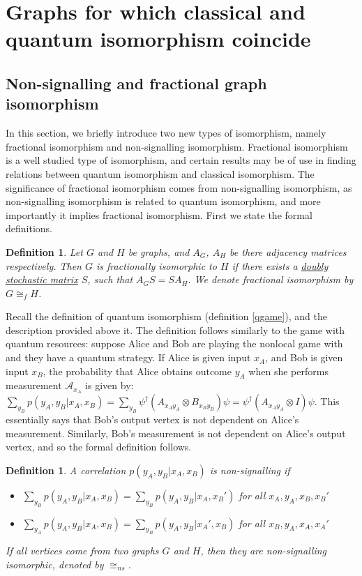 \documentclass[12pt]{article}
\newtheorem{defn}[thm]{Definition}
\begin{document}
\section{Graphs for which classical and quantum isomorphism coincide}
\subsection{Non-signalling and fractional graph isomorphism}
In this section, we briefly introduce two new types of isomorphism, namely fractional isomorphism and non-signalling isomorphism. Fractional isomorphism is a well studied type of isomorphism, and certain results may be of use in finding relations between quantum isomorphism and classical isomorphism. The significance of fractional isomorphism comes from non-signalling isomorphism, as non-signalling isomorphism is related to quantum isomorphism, and more importantly it implies fractional isomorphism. First we state the formal definitions.

\begin{defn} Let $G$ and $H$ be graphs, and $A_G$, $A_H$ be there adjacency matrices respectively. Then $G$ is fractionally isomorphic to $H$ if there exists a \hyperlink{stochastic}{doubly stochastic matrix} $S$, such that $A_GS = SA_H$. We denote fractional isomorphism by $G \cong_f H$.
\end{defn}

Recall the definition of quantum isomorphism (definition \ref{qgame}), and the description provided above it. The definition follows similarly to the game with quantum resources: suppose Alice and Bob are playing the nonlocal game with and they have a quantum strategy. If Alice is given input $x_A$, and Bob is given input $x_B$, the probability that Alice obtains outcome $y_A$ when she performs measurement $\mathcal{A}_{x_A}$ is given by: $\sum_{y_B}p(y_A, y_B | x_A, x_B) = \sum_{y_B}\psi^\dag(A_{x_Ay_A}\otimes B_{x_By_B})\psi = \psi^\dag(A_{x_Ay_A}\otimes I)\psi$. This essentially says that Bob's output vertex is not dependent on Alice's measurement. Similarly, Bob's measurement is not dependent on Alice's output vertex, and so the formal definition follows.

\begin{defn}
A correlation $p(y_A, y_B | x_A, x_B)$ is non-signalling if 
\begin{itemize}
\item $\sum_{y_B}p(y_A, y_B | x_A, x_B) = \sum_{y_B}p(y_A, y_B | x_A, x_B')$ for all $x_A, y_A, x_B, x_B'$
\item $\sum_{y_A}p(y_A, y_B | x_A, x_B) = \sum_{y_B}p(y_A, y_B | x_A', x_B)$ for all $x_B, y_A, x_A, x_A'$
\end{itemize}
If all vertices come from two graphs $G$ and $H$, then they are non-signalling isomorphic, denoted by $\cong_{ns}$.
\end{defn}
\end{document}
